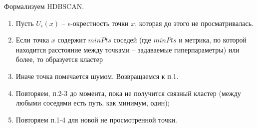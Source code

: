 Формализуем HDBSCAN.
\begin{enumerate}
    \item Пусть $U_\epsilon(x)$ -- $\epsilon$-окрестность точки $x$, которая до этого не просматривалась. 
    \item Если точка $x$ содержит $minPts$ соседей (где $minPts$ и метрика, по которой находится расстояние между точками -- задаваемые гиперпараметры) или более, то образуется кластер
    \item Иначе точка помечается шумом. Возвращаемся к п.1.
    \item Повторяем, п.2-3 до момента, пока не получится связный кластер (между любыми соседями есть путь, как минимум, один);
    \item Повторяем п.1-4 для новой не просмотренной точки.
\end{enumerate}


